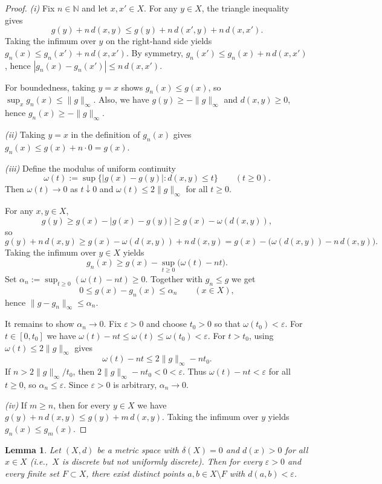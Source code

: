 \documentclass[11pt]{amsart}
\newtheorem{lemma}[theorem]{Lemma}
\theoremstyle{definition}
\newcommand{\N}{\mathbb{N}}
\renewcommand{\le}{\leqslant}
\renewcommand{\ge}{\geqslant}
\begin{document}
\begin{proof}
\emph{(i)} Fix $n\in\N$ and let $x,x'\in X$. For any $y\in X$, the triangle inequality gives
\[
g(y)+n\,d(x,y)\le g(y)+n\,d(x',y)+n\,d(x,x').
\]
Taking the infimum over $y$ on the right-hand side yields $g_n(x)\le g_n(x')+n\,d(x,x')$.
By symmetry, $g_n(x')\le g_n(x)+n\,d(x,x')$, hence $|g_n(x)-g_n(x')|\le n\,d(x,x')$.

For boundedness, taking $y=x$ shows $g_n(x)\le g(x)$, so $\sup_x g_n(x)\le \|g\|_\infty$.
Also, we have $g(y)\ge -\|g\|_\infty$ and $d(x,y)\ge0$, hence $g_n(x)\ge -\|g\|_\infty$.
\smallskip

\emph{(ii)} Taking $y=x$ in the definition of $g_n(x)$ gives
$g_n(x)\le g(x)+n\cdot 0=g(x)$.

\smallskip
\emph{(iii)} Define the modulus of uniform continuity
\[
\omega(t):=\sup\{|g(x)-g(y)|:d(x,y)\le t\}\qquad(t\ge0).
\]
Then $\omega(t)\to0$ as $t\downarrow0$ and $\omega(t)\le 2\|g\|_\infty$ for all $t\ge0$.

For any $x,y\in X$,
\[
g(y)\ge g(x)-|g(x)-g(y)|\ge g(x)-\omega(d(x,y)),
\]
so
\[
g(y)+n\,d(x,y)\ge g(x)-\omega(d(x,y))+n\,d(x,y)
= g(x)-\bigl(\omega(d(x,y))-n\,d(x,y)\bigr).
\]
Taking the infimum over $y\in X$ yields
\[
g_n(x)\ge g(x)-\sup_{t\ge0}\bigl(\omega(t)-nt\bigr).
\]
Set $\alpha_n:=\sup_{t\ge0}(\omega(t)-nt)\ge0$. Together with $g_n\le g$ we get
\[
0\le g(x)-g_n(x)\le \alpha_n\qquad(x\in X),
\]
hence $\|g-g_n\|_\infty\le \alpha_n$.

It remains to show $\alpha_n\to0$. Fix $\varepsilon>0$ and choose $t_0>0$ so that $\omega(t_0)<\varepsilon$.
For $t\in[0,t_0]$ we have $\omega(t)-nt\le \omega(t)\le \omega(t_0)<\varepsilon$.
For $t>t_0$, using $\omega(t)\le 2\|g\|_\infty$ gives
\[
\omega(t)-nt\le 2\|g\|_\infty-nt_0.
\]
If $n>2\|g\|_\infty/t_0$, then $2\|g\|_\infty-nt_0<0<\varepsilon$.
Thus $\omega(t)-nt<\varepsilon$ for all $t\ge0$, so $\alpha_n\le\varepsilon$.
Since $\varepsilon>0$ is arbitrary, $\alpha_n\to0$.
\smallskip

\emph{(iv)} If $m\ge n$, then for every $y\in X$ we have
$g(y)+n\,d(x,y)\le g(y)+m\,d(x,y)$.
Taking the infimum over $y$ yields $g_n(x)\le g_m(x)$.
\end{proof}

\begin{lemma}\label{lem:many-close-pairs}
Let $(X,d)$ be a metric space with $\delta(X)=0$ and $d(x)>0$ for all $x\in X$
(i.e.,\ $X$ is discrete but not uniformly discrete). Then for every $\varepsilon>0$
and every finite set $F\subset X$, there exist distinct points $a,b\in X\setminus F$
with $d(a,b)<\varepsilon$.
\end{lemma}
\end{document}

